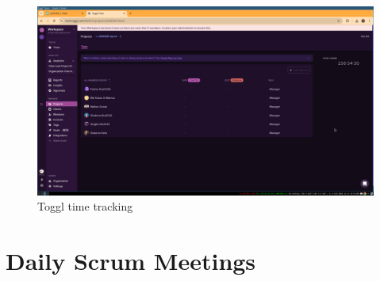 \documentclass[a4paper,12pt]{article}
\begin{document}
\begin{figure}[H]
    \centering
    \includegraphics[width=\textwidth]{images/toggl.png}
    \caption{Toggl time tracking}
\end{figure}

\newpage
\section{Daily Scrum Meetings}
\end{document}
